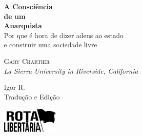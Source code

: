 

\begin{titlepage}
	\center
	
	\fontsize{44}{52}\selectfont\textbf{A Consciência}\\
	\fontsize{26}{32}\selectfont\textbf{de um}\\\vspace{-25pt}
	\fontsize{56}{68}\selectfont\textbf{Anarquista}\\\vspace{10pt}
	\fontsize{20}{26}\selectfont\textsf{Por que é hora de dizer adeus ao estado\\e construir uma sociedade livre}  
	   
	\vfill
	
	\LARGE\textsc{Gary Chartier}\\
	\normalsize\emph{La Sierra University in Riverside, California} 
	 
	\vfill 
	        
	\large Igor R.\\
	\normalsize Tradução e Edição
	
	\vfill
	
	\includegraphics[width=1.1in]{./assets/fl}
\end{titlepage}

\restoregeometry  